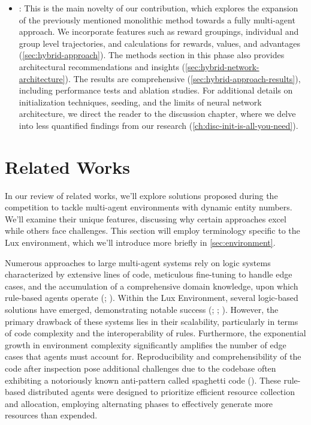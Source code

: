 \begin{itemize}[itemsep=4pt, parsep=0pt]
\item {}: This is the main novelty of our contribution, which explores the expansion of the previously mentioned monolithic method towards a fully multi-agent approach. We incorporate features such as reward groupings, individual and group level trajectories, and calculations for rewards, values, and advantages (\autoref{sec:hybrid-approach}). The methods section in this phase also provides architectural recommendations and insights (\autoref{sec:hybrid-network-architecture}). The results are comprehensive (\autoref{sec:hybrid-approach-results}), including performance tests and ablation studies. For additional details on initialization techniques, seeding, and the limits of neural network architecture, we direct the reader to the discussion chapter, where we delve into less quantified findings from our research (\autoref{ch:disc-init-is-all-you-need}).

\end{itemize}

\section{Related Works}

\noindent In our review of related works, we'll explore solutions proposed during the competition to tackle multi-agent environments with dynamic entity numbers. We'll examine their unique features, discussing why certain approaches excel while others face challenges. This section will employ terminology specific to the Lux environment, which we'll introduce more briefly in \autoref{sec:environment}.

\noindent Numerous approaches to large multi-agent systems rely on logic systems characterized by extensive lines of code, meticulous fine-tuning to handle edge cases, and the accumulation of a comprehensive domain knowledge, upon which rule-based agents operate (\textcolor{deepblue}{\cite{du2024survey}; \cite{Aguayo_Canela_2021}}). Within the Lux Environment, several logic-based solutions have emerged, demonstrating notable success (\textcolor{deepblue}{\cite{ry_andy}; \cite{tigga}; \cite{kostuch}}). However, the primary drawback of these systems lies in their scalability, particularly in terms of code complexity and the interoperability of rules. Furthermore, the exponential growth in environment complexity significantly amplifies the number of edge cases that agents must account for. Reproducibility and comprehensibility of the code after inspection pose additional challenges due to the codebase often exhibiting a notoriously known anti-pattern called spaghetti code (\textcolor{deepblue}{\cite{Politowski_2020}}). These rule-based distributed agents were designed to prioritize efficient resource collection and allocation, employing alternating phases to effectively generate more resources than expended.

